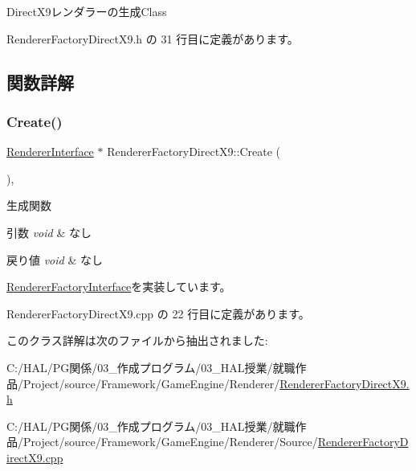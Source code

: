 Direct\+X9レンダラーの生成\+Class 

 Renderer\+Factory\+Direct\+X9.\+h の 31 行目に定義があります。



\subsection{関数詳解}
\mbox{\label{class_renderer_factory_direct_x9_a55541ea707af7ba3c006b0ea11a1fd49}} 
\subsubsection{\texorpdfstring{Create()}{Create()}}
{\footnotesize\ttfamily \mbox{\hyperlink{class_renderer_interface}{Renderer\+Interface}} $\ast$ Renderer\+Factory\+Direct\+X9\+::\+Create (\begin{DoxyParamCaption}{ }\end{DoxyParamCaption})\hspace{0.3cm}{\ttfamily [override]}, {\ttfamily [virtual]}}



生成関数 


\begin{DoxyParams}{引数}
{\em void} & なし \\
\hline
\end{DoxyParams}

\begin{DoxyRetVals}{戻り値}
{\em void} & なし \\
\hline
\end{DoxyRetVals}


\mbox{\hyperlink{class_renderer_factory_interface_aa81911973b6079fda8489409385d71e3}{Renderer\+Factory\+Interface}}を実装しています。



 Renderer\+Factory\+Direct\+X9.\+cpp の 22 行目に定義があります。



このクラス詳解は次のファイルから抽出されました\+:\begin{DoxyCompactItemize}
\item 
C\+:/\+H\+A\+L/\+P\+G関係/03\+\_\+作成プログラム/03\+\_\+\+H\+A\+L授業/就職作品/\+Project/source/\+Framework/\+Game\+Engine/\+Renderer/\mbox{\hyperlink{_renderer_factory_direct_x9_8h}{Renderer\+Factory\+Direct\+X9.\+h}}\item 
C\+:/\+H\+A\+L/\+P\+G関係/03\+\_\+作成プログラム/03\+\_\+\+H\+A\+L授業/就職作品/\+Project/source/\+Framework/\+Game\+Engine/\+Renderer/\+Source/\mbox{\hyperlink{_renderer_factory_direct_x9_8cpp}{Renderer\+Factory\+Direct\+X9.\+cpp}}\end{DoxyCompactItemize}
